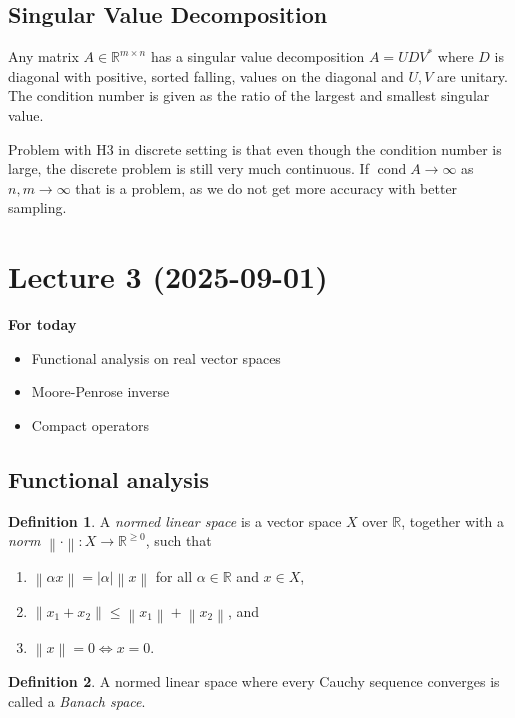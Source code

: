 \documentclass[12pt]{article}
\theoremstyle{definition}
\newtheorem{definition}{Definition}[section]
\newcommand{\real}{\mathbb{R}}   %
\DeclareMathOperator{\cond}{cond}
\newcommand\norm[1]{\left\lVert#1\right\rVert}
\begin{document}
\subsection{Singular Value Decomposition}
Any matrix $A\in\real^{m\times n}$ has a singular value decomposition $A=UDV^*$ where $D$ is diagonal with positive, sorted falling, values on the diagonal and $U,V$ are unitary. The condition number is given as the ratio of the largest and smallest singular value.

Problem with H3 in discrete setting is that even though the condition number is large, the discrete problem is still very much continuous. If $\cond A\to \infty$ as $n,m\to\infty$ that is a problem, as we do not get more accuracy with better sampling.

\newpage

\section{Lecture 3 (2025-09-01)}
\textbf{For today}
\begin{itemize}
    \item Functional analysis on real vector spaces
    \item Moore-Penrose inverse
    \item Compact operators
\end{itemize}

\subsection{Functional analysis}
\begin{definition}
    A \textit{normed linear space} is a vector space $X$ over $\real$, together with a \textit{norm} $\norm{\cdot}:X\to\real^{\geq0}$, such that 
    \begin{enumerate}[label=(\alph*)]
        \item $\norm{\alpha x}=|\alpha|\norm{x}$ for all $\alpha\in \real$ and $x\in X$,
        \item $\norm{x_1+x_2}\leq \norm{x_1}+\norm{x_2}$, and
        \item $\norm{x}=0\Longleftrightarrow x=0$. 
    \end{enumerate}
\end{definition}

\begin{definition}
    A normed linear space where every Cauchy sequence converges is called a \textit{Banach space}. 
\end{definition}
\end{document}
